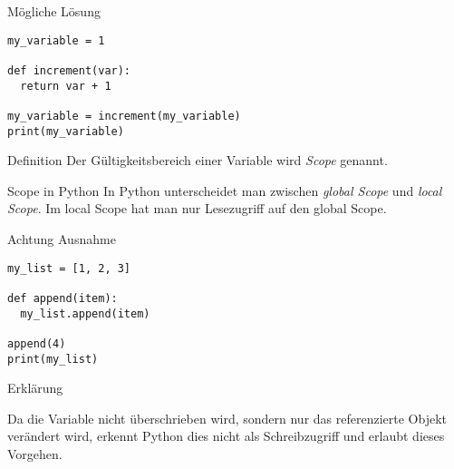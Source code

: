 \begin{fragile}

\begin{block}{Mögliche Lösung}
	\vspace{2pt}
\begin{verbatim}
my_variable = 1

def increment(var): 
  return var + 1

my_variable = increment(my_variable)
print(my_variable)
\end{verbatim}

\vspace{12pt}

\end{block}
	
\end{fragile}

\begin{frame}
	
\begin{block}{Definition}
\vspace{2pt}
Der Gültigkeitsbereich einer Variable wird \emph{Scope} genannt. 
\end{block}
\vspace{12pt}
\pause 

\begin{block}{Scope in Python}
\vspace{2pt}
In Python unterscheidet man zwischen \emph{global Scope} und \emph{local Scope}. Im local Scope hat man nur Lesezugriff auf den global Scope. 	
\end{block}
	
\end{frame}

\begin{fragile}
\begin{alertblock}{Achtung Ausnahme}
\begin{verbatim}
my_list = [1, 2, 3]

def append(item):
  my_list.append(item)

append(4)
print(my_list)
\end{verbatim}
\end{alertblock}

\vspace{12pt}

\begin{exampleblock}{Erklärung}
	
\pause 

Da die Variable  nicht überschrieben wird, sondern nur das referenzierte Objekt verändert wird, erkennt Python dies nicht als Schreibzugriff und erlaubt dieses Vorgehen. 
\end{exampleblock}
\end{fragile}


